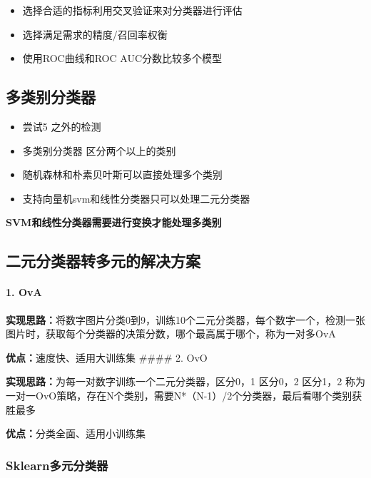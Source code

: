 \documentclass[11pt]{article}
\providecommand{\tightlist}{%
      \setlength{\itemsep}{0pt}\setlength{\parskip}{0pt}}
\begin{document}
\begin{itemize}
\tightlist
\item
  选择合适的指标利用交叉验证来对分类器进行评估
\item
  选择满足需求的精度/召回率权衡
\item
  使用ROC曲线和ROC AUC分数比较多个模型
\end{itemize}

    \hypertarget{ux591aux7c7bux522bux5206ux7c7bux5668}{%
\subsection{多类别分类器}\label{ux591aux7c7bux522bux5206ux7c7bux5668}}

\begin{itemize}
\tightlist
\item
  尝试5 之外的检测
\item
  多类别分类器 区分两个以上的类别
\item
  随机森林和朴素贝叶斯可以直接处理多个类别
\item
  支持向量机svm和线性分类器只可以处理二元分类器
\end{itemize}

\textbf{SVM和线性分类器需要进行变换才能处理多类别}

    \hypertarget{ux4e8cux5143ux5206ux7c7bux5668ux8f6cux591aux5143ux7684ux89e3ux51b3ux65b9ux6848}{%
\subsection{二元分类器转多元的解决方案}\label{ux4e8cux5143ux5206ux7c7bux5668ux8f6cux591aux5143ux7684ux89e3ux51b3ux65b9ux6848}}

\hypertarget{ova}{%
\paragraph{1. OvA}\label{ova}}

\textbf{实现思路：}将数字图片分类0到9，训练10个二元分类器，每个数字一个，检测一张图片时，获取每个分类器的决策分数，哪个最高属于哪个，称为一对多OvA

\textbf{优点：}速度快、适用大训练集 \#\#\#\# 2. OvO

\textbf{实现思路：}为每一对数字训练一个二元分类器，区分0，1 区分0，2
区分1，2
称为一对一OvO策略，存在N个类别，需要N*（N-1）/2个分类器，最后看哪个类别获胜最多

\textbf{优点：}分类全面、适用小训练集

    \hypertarget{sklearnux591aux5143ux5206ux7c7bux5668}{%
\subsubsection{Sklearn多元分类器}\label{sklearnux591aux5143ux5206ux7c7bux5668}}
\end{document}
